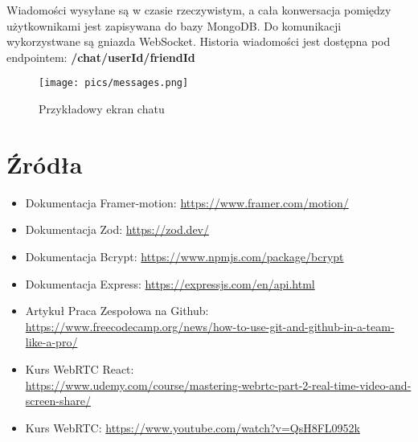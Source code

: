 \documentclass{article}
\begin{document}
Wiadomości wysyłane są w czasie rzeczywistym, a cała konwersacja pomiędzy użytkownikami jest zapisywana do bazy MongoDB. Do komunikacji wykorzystwane są gniazda WebSocket. Historia wiadomości jest dostępna pod endpointem: \textbf{/chat/userId/friendId}

\begin{figure}[h]
    \centering
    \texttt{[image: pics/messages.png]}
    \caption*{Przykładowy ekran chatu}
\end{figure}


\section{Źródła}
\begin{itemize}
    \item Dokumentacja Framer-motion: \url{https://www.framer.com/motion/}
    \item Dokumentacja Zod: \url{https://zod.dev/}
    \item Dokumentacja Bcrypt: \url{https://www.npmjs.com/package/bcrypt}
    \item Dokumentacja Express: \url{https://expressjs.com/en/api.html}
    \item Artykuł Praca Zespołowa na Github: \\
    \url{https://www.freecodecamp.org/news/how-to-use-git-and-github-in-a-team-like-a-pro/}
    \item Kurs WebRTC React: \\
    \url{https://www.udemy.com/course/mastering-webrtc-part-2-real-time-video-and-screen-share/}
    \item Kurs WebRTC: \url{https://www.youtube.com/watch?v=QsH8FL0952k}
\end{itemize}
\end{document}
